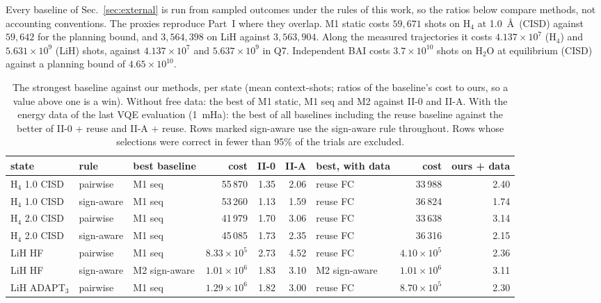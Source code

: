 \documentclass[aps,pra,reprint,superscriptaddress,nofootinbib]{revtex4-2}
\begin{document}
Every baseline of Sec.~\ref{sec:external} is run from sampled outcomes under the rules of this work, so the ratios below compare methods, not accounting conventions. The proxies reproduce Part~I where they overlap. M1 static costs $59{,}671$ shots on H$_4$ at 1.0~\AA\ (CISD) against $59{,}642$ for the planning bound, and $3{,}564{,}398$ on LiH against $3{,}563{,}904$. Along the measured trajectories it costs $4.137\times10^{7}$ (H$_4$) and $5.631\times10^{9}$ (LiH) shots, against $4.137\times10^{7}$ and $5.637\times10^{9}$ in Q7. Independent BAI costs $3.7\times10^{10}$ shots on H$_2$O at equilibrium (CISD) against a planning bound of $4.65\times10^{10}$.

\begin{table}[!htb]
\centering\small
\caption{The strongest baseline against our methods, per state (mean context-shots; ratios of the baseline's cost to ours, so a value above one is a win). Without free data: the best of M1 static, M1 seq and M2 against II-0 and II-A. With the energy data of the last VQE evaluation (1~mHa): the best of all baselines including the reuse baseline against the better of II-0 + reuse and II-A + reuse. Rows marked sign-aware use the sign-aware rule throughout. Rows whose selections were correct in fewer than 95\% of the trials are excluded.}
\label{tab:q8best}
\footnotesize\setlength{\tabcolsep}{3.5pt}
\begin{tabular}{lllrrrlrr}
\toprule
state & rule & best baseline & cost & II-0 & II-A & best, with data & cost & ours + data \\
\midrule
H$_4$ 1.0 CISD & pairwise & M1 seq & 55\,870 & 1.35 & 2.06 & reuse FC & 33\,988 & 2.40 \\
H$_4$ 1.0 CISD & sign-aware & M1 seq & 53\,260 & 1.13 & 1.59 & reuse FC & 36\,824 & 1.74 \\
H$_4$ 2.0 CISD & pairwise & M1 seq & 41\,979 & 1.70 & 3.06 & reuse FC & 33\,638 & 3.14 \\
H$_4$ 2.0 CISD & sign-aware & M1 seq & 45\,085 & 1.73 & 2.35 & reuse FC & 36\,316 & 2.15 \\
LiH HF & pairwise & M1 seq & $8.33\times10^{5}$ & 2.73 & 4.52 & reuse FC & $4.10\times10^{5}$ & 2.36 \\
LiH HF & sign-aware & M2 sign-aware & $1.01\times10^{6}$ & 1.83 & 3.10 & M2 sign-aware & $1.01\times10^{6}$ & 3.11 \\
LiH ADAPT$_3$ & pairwise & M1 seq & $1.29\times10^{6}$ & 1.82 & 3.00 & reuse FC & $8.70\times10^{5}$ & 2.30 \\

\end{tabular}
\end{table}
\end{document}
